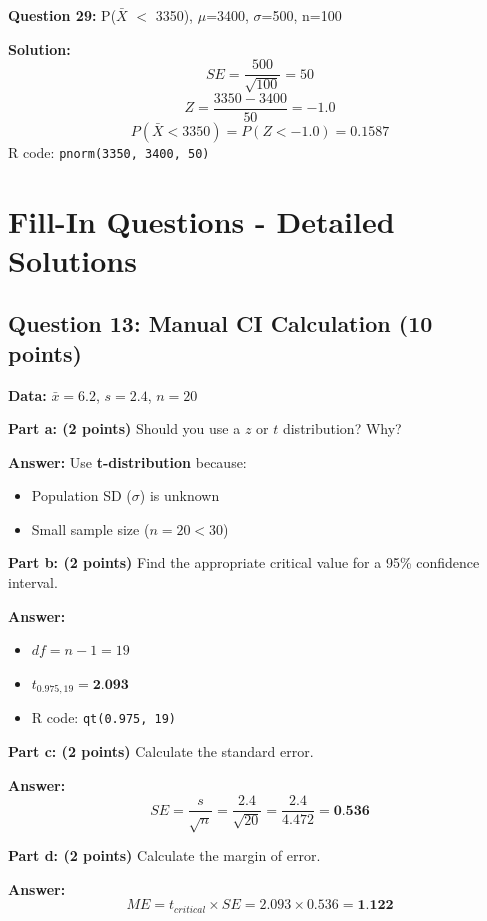 \documentclass[11pt]{article}
\begin{document}
\vspace{0.5cm}

\textbf{Question 29:} P($\bar{X}$ $<$ 3350), $\mu$=3400, $\sigma$=500, n=100

\textcolor{correctgreen}{\textbf{Solution:}}
$$SE = \frac{500}{\sqrt{100}} = 50$$
$$Z = \frac{3350-3400}{50} = -1.0$$
$$P(\bar{X} < 3350) = P(Z < -1.0) = 0.1587$$
R code: \texttt{pnorm(3350, 3400, 50)}

\newpage

\section*{Fill-In Questions - Detailed Solutions}

\subsection*{Question 13: Manual CI Calculation (10 points)}

\textbf{Data:} $\bar{x} = 6.2$, $s = 2.4$, $n = 20$

\textbf{Part a: (2 points)} Should you use a $z$ or $t$ distribution? Why?

\textcolor{correctgreen}{\textbf{Answer:}} Use \textbf{t-distribution} because:
\begin{itemize}
\item Population SD ($\sigma$) is unknown
\item Small sample size ($n = 20 < 30$)
\end{itemize}

\textbf{Part b: (2 points)} Find the appropriate critical value for a 95\% confidence interval.

\textcolor{correctgreen}{\textbf{Answer:}}
\begin{itemize}
\item $df = n - 1 = 19$
\item $t_{0.975, 19} = \textbf{2.093}$
\item R code: \texttt{qt(0.975, 19)}
\end{itemize}

\textbf{Part c: (2 points)} Calculate the standard error.

\textcolor{correctgreen}{\textbf{Answer:}}
$$SE = \frac{s}{\sqrt{n}} = \frac{2.4}{\sqrt{20}} = \frac{2.4}{4.472} = \textbf{0.536}$$

\textbf{Part d: (2 points)} Calculate the margin of error.

\textcolor{correctgreen}{\textbf{Answer:}}
$$ME = t_{critical} \times SE = 2.093 \times 0.536 = \textbf{1.122}$$
\end{document}
